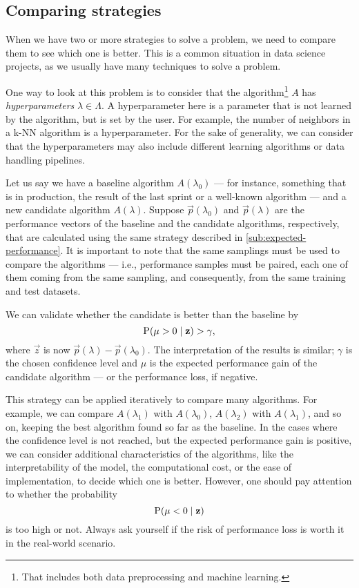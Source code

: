 \subsection{Comparing strategies}
\label{sub:comparison}

When we have two or more strategies to solve a problem, we need to compare them to see
which one is better.  This is a common situation in data science projects, as we usually
have many techniques to solve a problem.

One way to look at this problem is to consider that the algorithm\footnote{That includes
both data preprocessing and machine learning.} $A$ has \emph{hyperparameters} $\lambda \in
\Lambda$.  A hyperparameter here is a parameter that is not learned by the algorithm, but
is set by the user.  For example, the number of neighbors in a k-NN algorithm is a
hyperparameter.  For the sake of generality, we can consider that the hyperparameters may
also include different learning algorithms or data handling pipelines.

Let us say we have a baseline algorithm $A(\lambda_0)$ --- for instance, something that is
in production, the result of the last sprint or a well-known algorithm --- and a new candidate algorithm $A(\lambda)$.
Suppose $\vec{p}(\lambda_0)$ and $\vec{p}(\lambda)$ are the performance vectors of the
baseline and the candidate algorithms, respectively, that are calculated using the same
strategy described in \cref{sub:expected-performance}.  It is important to note that the
same samplings must be used to compare the algorithms --- i.e., performance samples must be
paired, each one of them coming from the same sampling, and consequently, from the same
training and test datasets.

We can validate whether the
candidate is better than the baseline by
\begin{equation*}
  \operatorname{P}(\mu > 0 \mid \mathbf{z}) > \gamma\text{,}
\end{equation*}
where $\vec{z}$ is now $\vec{p}(\lambda) - \vec{p}(\lambda_0)$.  The interpretation of the
results is similar; $\gamma$ is the chosen confidence level and $\mu$ is the expected
performance gain of the candidate algorithm --- or the performance loss, if negative.

This strategy can be applied iteratively to compare many algorithms.  For example, we can
compare $A(\lambda_1)$ with $A(\lambda_0)$, $A(\lambda_2)$ with $A(\lambda_1)$, and so on,
keeping the best algorithm found so far as the baseline. In the cases where the confidence
level is not reached, but the expected performance gain is positive, we can consider
additional characteristics of the algorithms, like the interpretability of the model, the
computational cost, or the ease of implementation, to decide which one is better. However,
one should pay attention to whether the probability
\begin{equation*}
  \operatorname{P}(\mu < 0 \mid \mathbf{z})
\end{equation*}
is too high or not.  Always ask yourself if the risk of performance loss is worth it in
the real-world scenario.

